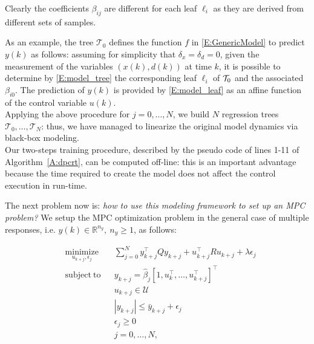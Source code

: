 {\begin{enumerate}
\begin{equation}
	\end{equation}
	Clearly the coefficients $\beta_{ij}$ are different for each leaf $\ell_i$ as they are derived from different sets of samples.
\end{enumerate}
As an example, the tree $\mathcal{T}_0$ defines the function $f$ in \eqref{E:GenericModel} to predict $y(k)$ as follows: assuming for simplicity that $\delta_x = \delta_d = 0$, given the measurement of the variables $(x(k), d(k))$ at time $k$, it is possible to determine by \eqref{E:model_tree} the corresponding leaf $\ell_i$ of $\mathcal{T}_0$ and the associated $\beta_{i0}$. The prediction of $y(k)$ is provided by \eqref{E:model_leaf} as an affine function of the control variable $u(k)$.\\
Applying the above procedure for $j=0,\ldots,N$, we build $N$ regression trees $\mathcal{T}_0,\ldots,\mathcal{T}_N$: thus, we have managed to linearize the original model dynamics via black-box modeling.\\ 
Our two-steps training procedure, described by the pseudo code of lines 1-11 of Algorithm~\ref{A:dpcrt}, can be computed off-line: this is an important advantage because the time required to create the model does not affect the control execution in run-time.}



\textcolor[rgb]{0,0,1}{The next problem now is: \emph{how to use this modeling framework to set up an MPC problem?} We setup the MPC optimization problem in the general case of multiple responses, i.e. $y(k)\in\mathbb{R}^{n_y},\ n_y\geq 1$, as follows:}

\begin{problem}\label{P:dpcrt}
	\begin{equation}
		\begin{aligned}
		& \underset{u_{k+j},\epsilon_j}{\mathrm{minimize}} & & \sum_{j=0}^{N} y^\top_{k+j} Q y_{k+j} + u^\top_{k+j} R u_{k+j} + \lambda\epsilon_j \\
		& \mathrm{subject\ to }                 & & y_{k+j}     =   \hat \beta_{j} [1,u^\top_{k},\ldots,u^\top_{k+j} ]^\top                       \\
		&                                       & & u_{k+j}    \in  \mathcal{U}                                                                   \\
		&                                       & & |y_{k+j}|  \leq \bar{y}_{k+j} + \epsilon_j 										              \\
		&                                       & & \epsilon_j \geq  0							                                                  \\
		&                                       & & j           =    0,\ldots,N,               									                  \\
		\end{aligned}
		\label{E:dpcrt}
	\end{equation}
\end{problem}

